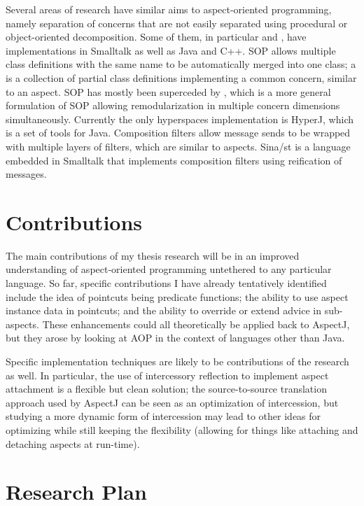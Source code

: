 \documentclass[12pt]{article}
\begin{document}
Several areas of research have similar aims to aspect-oriented
programming, namely separation of concerns that are not easily
separated using procedural or object-oriented decomposition.  Some of
them, in particular  \cite{SOP} and
 \cite{comp-filt}, have implementations in
Smalltalk as well as Java and C++.  SOP allows multiple class
definitions with the same name to be automatically merged into one
class; a  is a collection of partial class definitions
implementing a common concern, similar to an aspect.  SOP has mostly
been superceded by  \cite{MDSOC}, which is a more
general formulation of SOP allowing remodularization in multiple
concern dimensions simultaneously.  Currently the only hyperspaces
implementation is HyperJ, which is a set of tools for Java.
Composition filters allow message sends to be wrapped with multiple
layers of filters, which are similar to aspects.  Sina/st \cite{Sina} is
a language embedded in Smalltalk that implements composition filters
using reification of messages.

\section{Contributions}

The main contributions of my thesis research will be in an improved
understanding of aspect-oriented programming untethered to any
particular language.  So far, specific contributions I have already
tentatively identified include the idea of pointcuts being predicate
functions; the ability to use aspect instance data in pointcuts; and
the ability to override or extend advice in sub-aspects.  These
enhancements could all theoretically be applied back to AspectJ, but
they arose by looking at AOP in the context of languages other than
Java.

Specific implementation techniques are likely to be contributions of
the research as well.  In particular, the use of intercessory
reflection to implement aspect attachment is a flexible but clean
solution; the source-to-source translation approach used by AspectJ
can be seen as an optimization of intercession, but studying a more
dynamic form of intercession may lead to other ideas for optimizing
while still keeping the flexibility (allowing for things like
attaching and detaching aspects at run-time).

\section{Research Plan}
\end{document}
